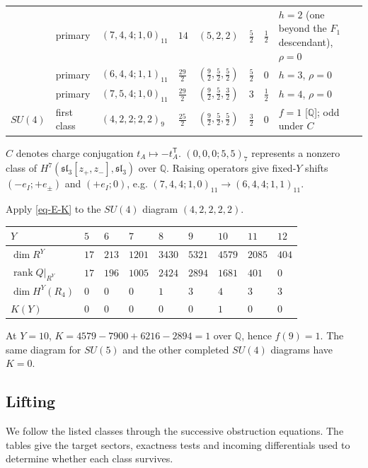 \documentclass[11pt]{article}
\numberwithin{equation}{section}
\numberwithin{figure}{section}
\numberwithin{table}{section}
\begin{document}
{\begin{xltabular}{\linewidth}{@{}lllllll>{\raggedright\arraybackslash}X@{}}
 & primary & $(7,4,4;1,0)_{11}$ & $14$ & $(5,2,2)$ & $\tfrac52$ & $\tfrac12$ & $h=2$ (one beyond the $F_1$ descendant), $\rho=0$\\
 & primary & $(6,4,4;1,1)_{11}$ & $\tfrac{29}2$ & $(\tfrac92,\tfrac52,\tfrac52)$ & $\tfrac52$ & $0$ & $h=3$, $\rho=0$\\
 & primary & $(7,5,4;1,0)_{11}$ & $\tfrac{29}2$ & $(\tfrac92,\tfrac52,\tfrac32)$ & $3$ & $\tfrac12$ & $h=4$, $\rho=0$\\
$SU(4)$ & first class & $(4,2,2;2,2)_9$ & $\tfrac{25}2$ & $(\tfrac92,\tfrac52,\tfrac52)$ & $\tfrac32$ & $0$ & $f=1$ [$\mathbb Q$]; odd under $C$\\
\bottomrule
\end{xltabular}}

$C$ denotes charge conjugation $t_A\mapsto-t_A^{\mathsf T}$. $(0,0,0;5,5)_7$ represents a nonzero class of $H^7(\mathfrak{sl}_3[z_+,z_-],\mathfrak{sl}_3)$ over $\mathbb Q$. Raising operators give fixed-$Y$ shifts $(-e_I;+e_\pm)$ and $(+e_I;0)$, e.g. $(7,4,4;1,0)_{11}\to(6,4,4;1,1)_{11}$.

Apply \eqref{eq-E-K} to the $SU(4)$ diagram $(4,2,2,2,2)$.

{\small\renewcommand{\arraystretch}{1.25}\setlength{\tabcolsep}{4pt}
\begin{xltabular}{\linewidth}{@{}llllllll>{\raggedright\arraybackslash}X@{}}
\toprule
$Y$ & $5$ & $6$ & $7$ & $8$ & $9$ & $10$ & $11$ & $12$\\
\midrule\endhead
$\dim R^Y$ & $17$ & $213$ & $1201$ & $3430$ & $5321$ & $4579$ & $2085$ & $404$\\
$\operatorname{rank}Q|_{R^Y}$ & $17$ & $196$ & $1005$ & $2424$ & $2894$ & $1681$ & $401$ & $0$\\
$\dim H^Y(R_4)$ & $0$ & $0$ & $0$ & $1$ & $3$ & $4$ & $3$ & $3$\\
$K(Y)$ & $0$ & $0$ & $0$ & $0$ & $0$ & $1$ & $0$ & $0$\\
\bottomrule
\end{xltabular}}

At $Y=10$, $K=4579-7900+6216-2894=1$ over $\mathbb Q$, hence $f(9)=1$. The same diagram for $SU(5)$ and the other completed $SU(4)$ diagrams have $K=0$.

\subsection{Lifting}\label{sec-E-SU-lift}

We follow the listed classes through the successive obstruction equations. The tables give the target sectors, exactness tests and incoming differentials used to determine whether each class survives.
\end{document}
